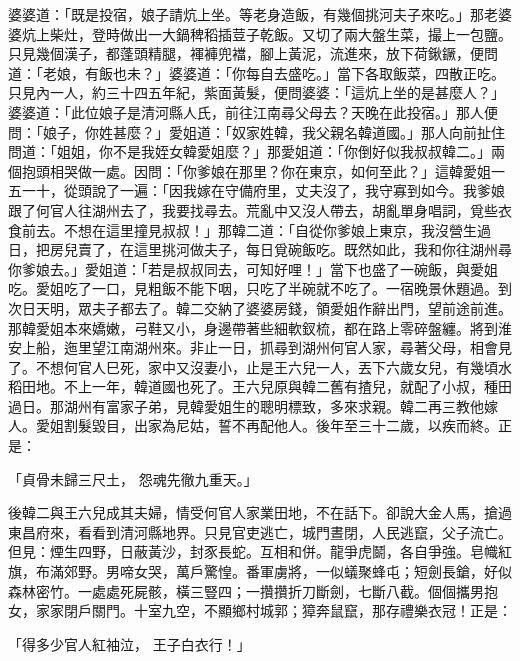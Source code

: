 \begin{showcontents}{}
婆婆道：「既是投宿，娘子請炕上坐。等老身造飯，有幾個挑河夫子來吃。」那老婆婆炕上柴灶，登時做出一大鍋稗稻插荳子乾飯。又切了兩大盤生菜，撮上一包鹽。只見幾個漢子，都蓬頭精腿，褌褲兜襠，腳上黃泥，流進來，放下荷鍬鐝，便問道：「老娘，有飯也未？」婆婆道：「你每自去盛吃。」當下各取飯菜，四散正吃。只見內一人，約三十四五年紀，紫面黃髮，便問婆婆：「這炕上坐的是甚麼人？」婆婆道：「此位娘子是清河縣人氏，前往江南尋父母去？天晚在此投宿。」那人便問：「娘子，你姓甚麼？」愛姐道：「奴家姓韓，我父親名韓道國。」那人向前扯住問道：「姐姐，你不是我姪女韓愛姐麼？」那愛姐道：「你倒好似我叔叔韓二。」兩個抱頭相哭做一處。因問：「你爹娘在那里？你在東京，如何至此？」這韓愛姐一五一十，從頭說了一遍：「因我嫁在守備府里，丈夫沒了，我守寡到如今。我爹娘跟了何官人往湖州去了，我要找尋去。荒亂中又沒人帶去，胡亂單身唱詞，覓些衣食前去。不想在這里撞見叔叔！」那韓二道：「自從你爹娘上東京，我沒營生過日，把房兒賣了，在這里挑河做夫子，每日覓碗飯吃。既然如此，我和你往湖州尋你爹娘去。」愛姐道：「若是叔叔同去，可知好哩！」當下也盛了一碗飯，與愛姐吃。愛姐吃了一口，見粗飯不能下咽，只吃了半碗就不吃了。一宿晚景休題過。到次日天明，眾夫子都去了。韓二交納了婆婆房錢，領愛姐作辭出門，望前途前進。那韓愛姐本來嬌嫩，弓鞋又小，身邊帶著些細軟釵梳，都在路上零碎盤纏。將到淮安上船，迤里望江南湖州來。非止一日，抓尋到湖州何官人家，尋著父母，相會見了。不想何官人巳死，家中又沒妻小，止是王六兒一人，丟下六歲女兒，有幾頃水稻田地。不上一年，韓道國也死了。王六兒原與韓二舊有揸兒，就配了小叔，種田過日。那湖州有富家子弟，見韓愛姐生的聰明標致，多來求親。韓二再三教他嫁人。愛姐割髮毀目，出家為尼姑，誓不再配他人。後年至三十二歲，以疾而終。正是：

「貞骨未歸三尺土，  怨魂先徹九重天。」

後韓二與王六兒成其夫婦，情受何官人家業田地，不在話下。卻說大金人馬，搶過東昌府來，看看到清河縣地界。只見官吏逃亡，城門晝閉，人民逃竄，父子流亡。但見：煙生四野，日蔽黃沙，封豕長蛇。互相和併。龍爭虎鬬，各自爭強。皂幟紅旗，布滿郊野。男啼女哭，萬戶驚惶。番軍虜將，一似蟻聚蜂屯；短劍長鎗，好似森林密竹。一處處死屍骸，橫三豎四；一攢攢折刀斷劍，七斷八截。個個攜男抱女，家家閉戶關門。十室九空，不顯鄉村城郭；獐奔鼠竄，那存禮樂衣冠！正是：

「得多少官人紅袖泣，  王子白衣行！」


\end{showcontents}
